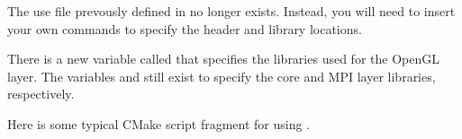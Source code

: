 The use file prevously defined in  no longer exists.
Instead, you will need to insert your own commands to specify the \IceT
header and library locations.

There is a new variable called  that specifies the
libraries used for the OpenGL layer.  The variables
 and  still exist to specify
the core and MPI layer libraries, respectively.

Here is some typical CMake script fragment for using \IceT.


